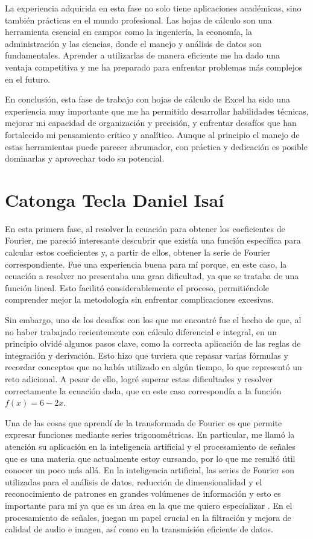 {La experiencia adquirida en esta fase no solo tiene aplicaciones académicas, sino también prácticas en el mundo profesional. Las hojas de cálculo son una herramienta esencial en campos como la ingeniería, la economía, la administración y las ciencias, donde el manejo y análisis de datos son fundamentales. Aprender a utilizarlas de manera eficiente me ha dado una ventaja competitiva y me ha preparado para enfrentar problemas más complejos en el futuro.

En conclusión, esta fase de trabajo con hojas de cálculo de Excel ha sido una experiencia muy importante que me ha permitido desarrollar habilidades técnicas, mejorar mi capacidad de organización y precisión, y enfrentar desafíos que han fortalecido mi pensamiento crítico y analítico. Aunque al principio el manejo de estas herramientas puede parecer abrumador, con práctica y dedicación es posible dominarlas y aprovechar todo su potencial.

\newpage
\section{Catonga Tecla Daniel Isaí}


En esta primera fase, al resolver la ecuación para obtener los coeficientes de Fourier, me pareció interesante descubrir que existía una función específica para calcular estos coeficientes y, a partir de ellos, obtener la serie de Fourier correspondiente. Fue una experiencia buena para mí porque, en este caso, la ecuación a resolver no presentaba una gran dificultad, ya que se trataba de una función lineal. Esto facilitó considerablemente el proceso, permitiéndole comprender mejor la metodología sin enfrentar complicaciones excesivas.

Sin embargo, uno de los desafíos con los que me encontré fue el hecho de que, al no haber trabajado recientemente con cálculo diferencial e integral, en un principio olvidé algunos pasos clave, como la correcta aplicación de las reglas de integración y derivación. Esto hizo que tuviera que repasar varias fórmulas y recordar conceptos que no había utilizado en algún tiempo, lo que representó un reto adicional.
A pesar de ello, logré superar estas dificultades y resolver correctamente la ecuación dada, que en este caso correspondía a la función \(f(x)=6-2x \). 

Una de las cosas que aprendí de la transformada de Fourier es que permite expresar funciones mediante series trigonométricas. En particular, me llamó la atención su aplicación en la inteligencia artificial y el procesamiento de señales que es una materia que actualmente estoy cursando, por lo que me resultó útil conocer un poco más allá. En la inteligencia artificial, las series de Fourier son utilizadas para el análisis de datos, reducción de dimensionalidad y el reconocimiento de patrones en grandes volúmenes de información y esto es importante para mí ya que es un área en la que me quiero especializar . En el procesamiento de señales, juegan un papel crucial en la filtración y mejora de calidad de audio e imagen, así como en la transmisión eficiente de datos.

}
